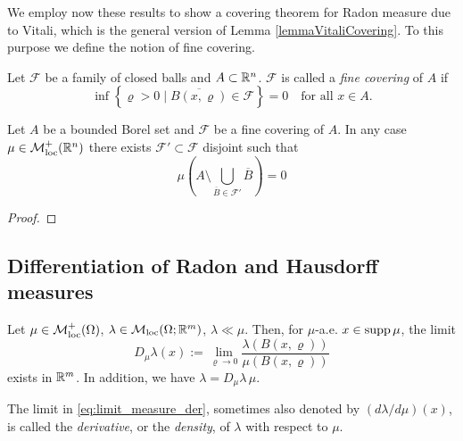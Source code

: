 We employ now these results to show a covering theorem for Radon measure due to Vitali, which is the general version of Lemma \ref{lemmaVitaliCovering}. To this purpose we define the notion of fine covering.

\begin{definition}
Let $\mathcal{F}$ be a family of closed balls and $A \subset \mathbb{R}^n$.
$\mathcal{F}$ is called a {\em fine covering} of $A$ if 
\[
\inf \left\{ \varrho > 0 \mid \overline{B(x,\varrho)} \in \mathcal{F}\right \} =
0 \quad \text{for all $x\in A$}.
\]
\end{definition}

\begin{theorem}
Let $A$ be a bounded Borel set and $\mathcal{F}$ be a fine covering of $A$. In
any case $\mu \in \mathcal{M}^+_{\rm loc}(\mathbb{R}^n)$ there exists $\mathcal{F}' \subset
\mathcal{F}$ disjoint such that 
\[
\mu \left( A \setminus \bigcup_{\overline{B}
\in \mathcal{F}'} \overline{B} \right) = 0
\]
\end{theorem}
\begin{proof}

\end{proof}

\subsection{Differentiation of Radon and Hausdorff measures}

\begin{theorem} \label{thm:Leb_Bes_diff}
Let $\mu \in \mathcal{M}^+_{\rm loc}(\Omega)$, $\lambda \in
\mathcal{M}_{\rm loc}(\Omega;\mathbb{R}^m)$, $\lambda \ll \mu$. Then, for $\mu$-a.e. $x \in
\operatorname{supp} \mu$, the limit 
\begin{equation} \label{eq:limit_measure_der}
D_{\mu}\lambda(x) := \lim_{\varrho \to 0} \frac{\lambda(B(x,\varrho))}{\mu(B(x,\varrho))}
\end{equation}
exists in $\mathbb{R}^m$. In addition, we have $\lambda = D_{\mu}\lambda \, \mu$.
\end{theorem}

The limit in \eqref{eq:limit_measure_der}, sometimes also denoted by $(d\lambda/d\mu)(x)$, is called the {\em derivative}, or the {\em density}, of $\lambda$ with respect to $\mu$. 

